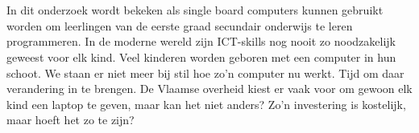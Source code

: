 
%
%

%



\chapter*{}

In dit onderzoek wordt bekeken als single board computers kunnen gebruikt worden om leerlingen van de eerste graad secundair onderwijs te leren programmeren. In de moderne wereld zijn ICT-skills nog nooit zo noodzakelijk geweest voor elk kind. Veel kinderen worden geboren met een computer in hun schoot. We staan er niet meer bij stil hoe zo'n computer nu werkt. Tijd om daar verandering in te brengen. De Vlaamse overheid kiest er vaak voor om gewoon elk kind een laptop te geven, maar kan het niet anders? Zo'n investering is kostelijk, maar hoeft het zo te zijn?

